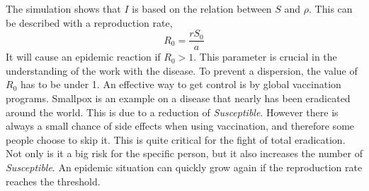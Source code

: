 \documentclass[%
twoside,                 %
final,                   %
chapterprefix=true,      %
open=right               %
10pt]{book}
\begin{document}
The simulation shows that $I$ is based on the relation between $S$ and $\rho$. This can be described with a reproduction rate,
\begin{equation}
R_0 = \frac{rS_0}{a}
\end{equation}
It will cause an epidemic reaction if $R_0 > 1$. This parameter is crucial in the understanding of the work with the disease. To prevent a dispersion, the value of $R_0$ has to be under 1. An effective way to get control is by global vaccination programs. Smallpox is an example on a disease that nearly has been eradicated around the world. This is due to a reduction of \emph{Susceptible}. However there is always a small chance of side effects when using vaccination, and therefore some people choose to skip it. This is quite critical for the fight of total eradication. Not only is it a big risk for the specific person, but it also increases the number of \emph{Susceptible}. An epidemic situation can quickly grow again if the reproduction rate reaches the threshold.


\vspace{3mm}




\vspace{3mm}
\end{document}

